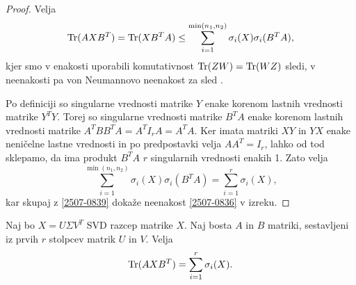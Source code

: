 \begin{proof}
    Velja
    \begin{align}
        \label{2507-0839}
        \operatorname{Tr}(AXB^T) = \operatorname{Tr}(XB^TA) \leq \sum^{\min(n_1, n_2)}_{i=1} \sigma_i(X) \sigma_i(B^TA),
    \end{align}
    kjer smo v enakosti uporabili komutativnost $\operatorname{Tr}(ZW)=\operatorname{Tr}(WZ)$ sledi,
    v neenakosti pa von Neumannovo neenakost za sled \cite{TNNM-HZYLH12}.

    Po definiciji so singularne vrednosti matrike $Y$ enake korenom lastnih vrednosti matrike $Y^TY$. Torej so singularne vrednosti matrike $B^TA$ enake korenom lastnih vrednosti matrike $A^TBB^TA=A^TI_rA = A^TA$.
    Ker imata matriki $XY$ in $YX$ enake neničelne lastne vrednosti in po predpostavki velja $AA^T = I_r$, lahko
    od tod sklepamo, da ima produkt $B^TA$ $r$ singularnih vrednosti enakih 1.
    Zato velja
    \[
        \sum^{\min(n_1, n_2)}_{i=1} \sigma_i(X) \sigma_i(B^TA) = \sum^{r}_{i=1} \sigma_i(X),
    \]
    kar skupaj z \eqref{2507-0839}
    dokaže neenakost \eqref{2507-0836}
    v izreku.
\end{proof}

\begin{theorem}
    \label{2507-0851}
    Naj bo $X = U \Sigma V^T$
    SVD razcep matrike $X$.
    Naj bosta $A$ in $B$ matriki, sestavljeni
    iz prvih $r$ stolpcev matrik $U$ in $V$.
    Velja
    \[\operatorname{Tr}(AXB^T) = \sum^{r}_{i=1} \sigma_i(X).\]
\end{theorem}

